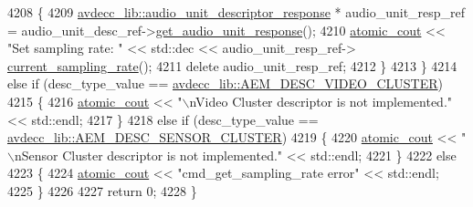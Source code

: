 \begin{DoxyCode}
4208         \{
4209             \hyperlink{classavdecc__lib_1_1audio__unit__descriptor__response}{avdecc\_lib::audio\_unit\_descriptor\_response} * 
      audio\_unit\_resp\_ref = audio\_unit\_desc\_ref->\hyperlink{classavdecc__lib_1_1audio__unit__descriptor_a1bc85ccfad8fa58cab10f58a6797919d}{get\_audio\_unit\_response}();
4210             \hyperlink{cmd__line_8h_a0bc38ccc65c79ba06c6fcd7b4bf554c3}{atomic\_cout} << \textcolor{stringliteral}{"Set sampling rate: "} << std::dec << audio\_unit\_resp\_ref->
      \hyperlink{classavdecc__lib_1_1audio__unit__descriptor__response_a115c8f2c1f0bd18abff75088d1932b02}{current\_sampling\_rate}();
4211             \textcolor{keyword}{delete} audio\_unit\_resp\_ref;
4212         \}
4213     \}
4214     \textcolor{keywordflow}{else} \textcolor{keywordflow}{if} (desc\_type\_value == \hyperlink{namespaceavdecc__lib_ac7b7d227e46bc72b63ee9e9aae15902fa2774c3076106c5643ace3a9e584f3ea0}{avdecc\_lib::AEM\_DESC\_VIDEO\_CLUSTER})
4215     \{
4216         \hyperlink{cmd__line_8h_a0bc38ccc65c79ba06c6fcd7b4bf554c3}{atomic\_cout} << \textcolor{stringliteral}{"\(\backslash\)nVideo Cluster descriptor is not implemented."} << std::endl;
4217     \}
4218     \textcolor{keywordflow}{else} \textcolor{keywordflow}{if} (desc\_type\_value == \hyperlink{namespaceavdecc__lib_ac7b7d227e46bc72b63ee9e9aae15902fa4c75b3f44e2393ef0f810ad6f074cea5}{avdecc\_lib::AEM\_DESC\_SENSOR\_CLUSTER})
4219     \{
4220         \hyperlink{cmd__line_8h_a0bc38ccc65c79ba06c6fcd7b4bf554c3}{atomic\_cout} << \textcolor{stringliteral}{"\(\backslash\)nSensor Cluster descriptor is not implemented."} << std::endl;
4221     \}
4222     \textcolor{keywordflow}{else}
4223     \{
4224         \hyperlink{cmd__line_8h_a0bc38ccc65c79ba06c6fcd7b4bf554c3}{atomic\_cout} << \textcolor{stringliteral}{"cmd\_get\_sampling\_rate error"} << std::endl;
4225     \}
4226 
4227     \textcolor{keywordflow}{return} 0;
4228 \}
\end{DoxyCode}


